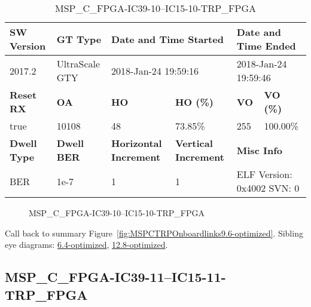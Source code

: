 \begin{table}[h]
\centering
\caption{MSP\_C\_FPGA-IC39-10--IC15-10-TRP\_FPGA}
\label{tab:MSPCFPGAIC3910IC1510TRPFPGA9.6-optimized}
\begin{tabular}{@{}|l|l|l|l|l|l|@{}}
\toprule
\textbf{SW Version}                & \textbf{GT Type}   & \multicolumn{2}{l|}{\textbf{Date and Time Started}}            & \multicolumn{2}{l|}{\textbf{Date and Time Ended}}        \\ \midrule
2017.2                       & UltraScale GTY          & \multicolumn{2}{l|}{2018-Jan-24 19:59:16}                   & \multicolumn{2}{l|}{2018-Jan-24 19:59:46}               \\ \midrule
\textbf{Reset RX}                  & \textbf{OA} & \textbf{HO}   & \textbf{HO (\%)} & \textbf{VO} & \textbf{VO (\%)} \\ \midrule
true & 10108        & 48          & 73.85\%        & 255        & 100.00\%       \\ \midrule
\textbf{Dwell Type}                & \textbf{Dwell BER} & \textbf{Horizontal Increment} & \textbf{Vertical Increment}    & \multicolumn{2}{l|}{\textbf{Misc Info}}                  \\ \midrule
BER                            & 1e-7        & 1        & 1           & \multicolumn{2}{l|}{ELF Version: 0x4002 SVN: 0}                         \\ \bottomrule
\end{tabular}
\end{table}

\begin{figure}[h]
\caption{MSP\_C\_FPGA-IC39-10--IC15-10-TRP\_FPGA} \label{fig:MSPCFPGAIC3910IC1510TRPFPGA9.6-optimized}
\end{figure}

Call back to summary Figure~\ref{fig:MSPCTRPOnboardlinks9.6-optimized}.
Sibling eye diagrams: \hyperref[sec:MSPCFPGAIC3910IC1510TRPFPGA6.4-optimized]{6.4-optimized}, \hyperref[sec:MSPCFPGAIC3910IC1510TRPFPGA12.8-optimized]{12.8-optimized}.

\clearpage
\newpage


\subsection{MSP\_C\_FPGA-IC39-11--IC15-11-TRP\_FPGA}\label{sec:MSPCFPGAIC3911IC1511TRPFPGA9.6-optimized}

